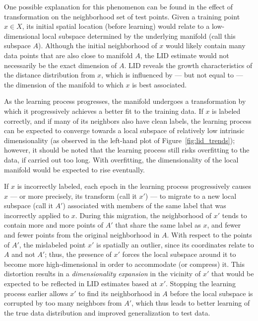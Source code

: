 \documentclass{article}
\begin{document}
One possible explanation for this phenomenon can be found in the effect of transformation on the neighborhood set of test points.
Given a training point $x\in X$, its initial spatial location (before learning) would relate to a low-dimensional local subspace determined by the underlying manifold (call this subspace $A$). 
Although the initial neighborhood of $x$ would likely contain many data points that are also close to manifold $A$, the LID estimate would not
necessarily be the exact dimension of $A$. LID reveals the growth characteristics of the distance distribution from $x$, which is influenced by --- but not equal to --- the dimension of the manifold to which $x$ is best associated.


As the learning process progresses, the manifold undergoes a transformation by which it progressively achieves a better fit to the training data. If $x$ is labeled correctly, and if many of its neighbors also have clean labels, the learning process can be expected to converge towards a local subspace of relatively low intrinsic dimensionality (as observed in the left-hand plot of Figure~\ref{fig:lid_trends}); however, it should be noted that the learning process still risks overfitting to the data, if carried out too long. With overfitting, the dimensionality of the local manifold would be expected to rise eventually.

If $x$ is incorrectly labeled, each epoch in the learning process progressively causes $x$ --- or more precisely, its transform (call it $x'$) --- to migrate to a new local subspace (call it $A'$) associated with members of the same label that was incorrectly applied to $x$. During this migration, the neighborhood of $x'$ tends to contain more and more points of $A'$ that share the same label as $x$, and fewer and fewer points from the original neighborhood in $A$. With respect to the points of $A'$, the mislabeled point $x'$ is spatially an outlier, since its coordinates relate to $A$ and not $A'$; thus, the presence of $x'$ forces the local subspace around it to become more high-dimensional in order to accommodate (or compress) it. This distortion results in a {\em dimensionality expansion} in the vicinity of $x'$ that would be expected to be reflected in LID estimates based at $x'$. Stopping the learning process earlier allows $x'$ to find its neighborhood in $A$ before the local subspace is corrupted by too many neighbors from $A'$, which thus leads to better learning of the true data distribution and improved generalization to test data.
\end{document}
